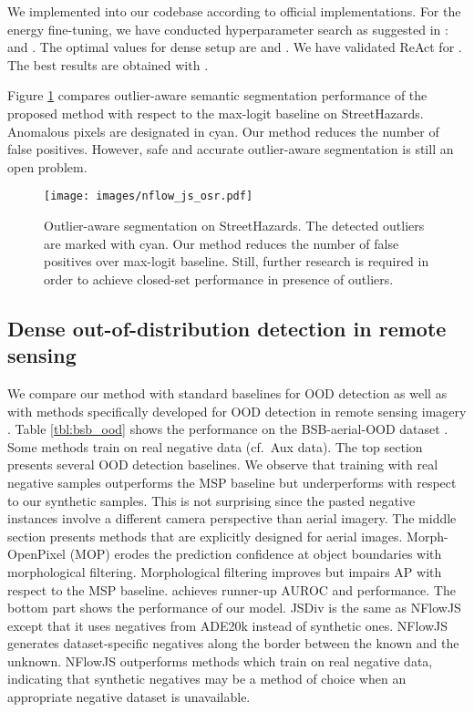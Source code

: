 \documentclass[lettersize,journal,hidelinks]{IEEEtran}
\begin{document}
We implemented \cite{hendrycks19iclr,liang18iclr,liu20neurips,sun21neurips} into our codebase according to official implementations.
For the energy fine-tuning, we have conducted hyperparameter search as suggested in \cite{liu20neurips}:  and .
The optimal values for dense setup are  and .
We have validated ReAct \cite{sun21neurips} for .
The best results are obtained with .


Figure \ref{fig:sh_osr} compares outlier-aware semantic segmentation performance of the proposed method with respect to the max-logit baseline \cite{hendrycks19arxiv} on StreetHazards.
Anomalous pixels are designated in cyan.
Our method reduces the number of false positives.
However, safe and accurate outlier-aware segmentation is still an open problem.
\begin{figure}[ht]
    \centering
    \texttt{[image: images/nflow\_js\_osr.pdf]}
    \caption{Outlier-aware segmentation on StreetHazards.
    The detected outliers are marked with cyan.
    Our method reduces the number of false positives over max-logit baseline. Still, further research is required in order to achieve closed-set performance in presence of outliers.}
    \label{fig:sh_osr}
\end{figure}


\subsection{Dense out-of-distribution detection in remote sensing}
\label{sec:exp_ood_rs}


We compare our method with standard baselines for OOD detection \cite{hendrycks17iclr,liu20neurips,hendrycks19iclr} as well as with methods specifically developed for OOD detection in remote sensing imagery \cite{gawlikowski21igrass,dasilva20arxiv}.
Table \ref{tbl:bsb_ood} shows the performance on the BSB-aerial-OOD dataset \cite{carvalho22rs}.
Some methods train on real negative data (cf.\ Aux data).
The top section presents several OOD detection baselines.
We observe that training with real negative samples outperforms the MSP baseline \cite{hendrycks17iclr} but underperforms with respect to our synthetic samples.
This is not surprising since the pasted negative instances involve a  different camera perspective than aerial imagery.
The middle section presents methods that are explicitly designed for aerial images.
Morph-OpenPixel (MOP) \cite{dasilva20arxiv} erodes the prediction confidence at object boundaries with morphological filtering.
Morphological filtering improves  but impairs AP with respect to the MSP baseline.
 \cite{gawlikowski21igrass} achieves runner-up AUROC and  performance.
The bottom part shows the performance of our model.
JSDiv is the same as NFlowJS except that it
uses negatives from ADE20k instead of synthetic ones.
NFlowJS generates dataset-specific negatives along the border between the known and the unknown.
NFlowJS outperforms methods which train on real negative data, indicating that synthetic negatives may be a method of choice when an appropriate negative dataset is unavailable.
\end{document}
